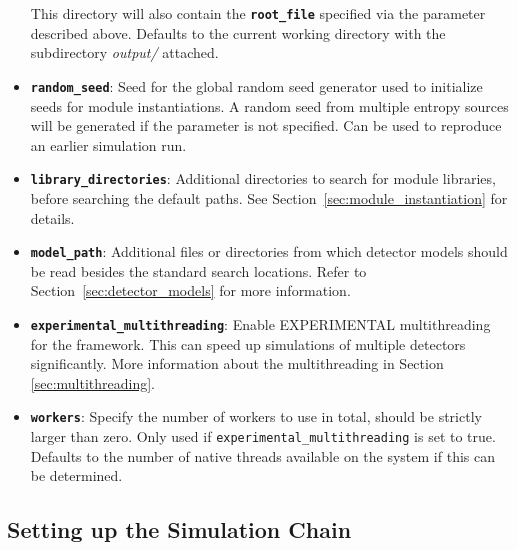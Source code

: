 \begin{itemize}
This directory will also contain the \textbf{\texttt{root\_file}} specified via the parameter described above.
Defaults to the current working directory with the subdirectory \textit{output/} attached.
\item \textbf{\texttt{random\_seed}}: Seed for the global random seed generator used to initialize seeds for module instantiations.
A random seed from multiple entropy sources will be generated if the parameter is not specified.
Can be used to reproduce an earlier simulation run.
\item \textbf{\texttt{library\_directories}}: Additional directories to search for module libraries, before searching the default paths.
See Section~\ref{sec:module_instantiation} for details.
\item \textbf{\texttt{model\_path}}: Additional files or directories from which detector models should be read besides the standard search locations.
Refer to Section~\ref{sec:detector_models} for more information.
\item \textbf{\texttt{experimental\_multithreading}}: Enable EXPERIMENTAL multithreading for the framework. This can speed up simulations of multiple detectors significantly. More information about the multithreading in Section \ref{sec:multithreading}.
\item \textbf{\texttt{workers}}: Specify the number of workers to use in total, should be strictly larger than zero. Only used if \texttt{experimental\_multithreading} is set to true. Defaults to the number of native threads available on the system if this can be determined.
\end{itemize}

\subsection{Setting up the Simulation Chain}
\label{sec:setting_up_simulation_chain}

